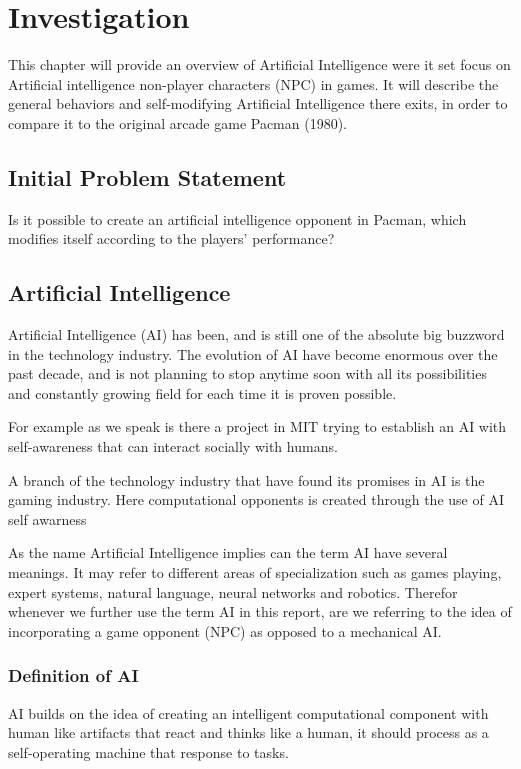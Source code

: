 \section{Investigation} \label{sec:preanalysus}
This chapter will provide an overview of Artificial Intelligence were it set focus on Artificial intelligence non-player characters (NPC) in games. It will describe the general behaviors and self-modifying Artificial Intelligence there exits, in order to compare it to the original arcade game Pacman (1980). 


\subsection{Initial Problem Statement} \label{sec:initialproblemstatement}
Is it possible to create an artificial intelligence opponent in Pacman, which modifies itself according to the players' performance?


\subsection{Artificial Intelligence} \label{sec:ai}
Artificial Intelligence (AI) has been, and is still one of the absolute big buzzword in the technology industry. 
The evolution of AI have become enormous over the past decade, and is not planning to stop anytime soon with all its possibilities and constantly growing field for each time it is proven possible.
  
For example as we speak is there a project in MIT trying to establish an AI with self-awareness that can interact socially with humans.  

A branch of the technology industry that have found its promises in AI is the gaming industry. Here computational opponents is created through the use of AI 
self awarness 


As the name Artificial Intelligence implies can the term AI have several meanings. It may refer to different areas of specialization such as games playing, expert systems, natural language, neural networks and robotics.  
Therefor whenever we further use the term AI in this report, are we referring to the idea of incorporating a game opponent (NPC) as opposed to a mechanical AI. 


\subsubsection{Definition of AI}

AI builds on the idea of creating an intelligent computational component with human like artifacts that react and thinks like a human, it should process as a self-operating machine that response to tasks. 

